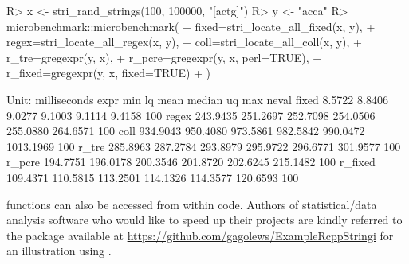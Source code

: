 \documentclass[nojss]{jss}\usepackage[]{graphicx}\usepackage[]{color}
\begin{document}
\begin{Schunk}
\begin{Sinput}
R> x <- stri_rand_strings(100, 100000, "[actg]")
R> y <- "acca"
R> microbenchmark::microbenchmark(
+    fixed=stri_locate_all_fixed(x, y),
+    regex=stri_locate_all_regex(x, y),
+    coll=stri_locate_all_coll(x, y),
+    r_tre=gregexpr(y, x),
+    r_pcre=gregexpr(y, x, perl=TRUE),
+    r_fixed=gregexpr(y, x, fixed=TRUE)
+  )
\end{Sinput}
\begin{Soutput}
Unit: milliseconds
    expr      min       lq     mean   median       uq       max neval
   fixed   8.5722   8.8406   9.0277   9.1003   9.1114    9.4158   100
   regex 243.9435 251.2697 252.7098 254.0506 255.0880  264.6571   100
    coll 934.9043 950.4080 973.5861 982.5842 990.0472 1013.1969   100
   r_tre 285.8963 287.2784 293.8979 295.9722 296.6771  301.9577   100
  r_pcre 194.7751 196.0178 200.3546 201.8720 202.6245  215.1482   100
 r_fixed 109.4371 110.5815 113.2501 114.1326 114.3577  120.6593   100
\end{Soutput}
\end{Schunk}





 functions can also be accessed
from within  code.
Authors of statistical/data analysis software who would like to
speed up their projects are kindly referred to the 
package available at \url{https://github.com/gagolews/ExampleRcppStringi}
for an illustration using  \citep{rcppbook}.







%
%
%
\end{document}
